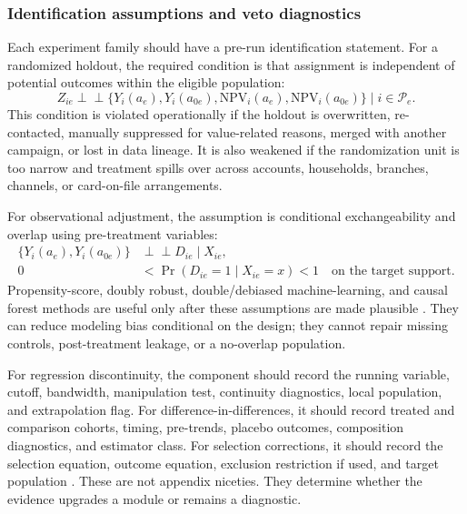 \documentclass[11pt]{article}
\newcommand{\NPV}{\mathrm{NPV}}
\newcommand{\1}{\mathbf{1}}
\begin{document}
\subsubsection{Identification assumptions and veto diagnostics}

Each experiment family should have a pre-run identification statement. For a
randomized holdout, the required condition is that assignment is independent of
potential outcomes within the eligible population:
\begin{equation}
  Z_{ie}
  \perp\!\!\!\perp
  \{Y_i(a_e),Y_i(a_{0e}),\NPV_i(a_e),\NPV_i(a_{0e})\}
  \mid i\in\mathcal{P}_e.
  \label{eq:randomization-assumption}
\end{equation}
This condition is violated operationally if the holdout is overwritten,
re-contacted, manually suppressed for value-related reasons, merged with
another campaign, or lost in data lineage. It is also weakened if the
randomization unit is too narrow and treatment spills over across accounts,
households, branches, channels, or card-on-file arrangements.

For observational adjustment, the assumption is conditional exchangeability
and overlap using pre-treatment variables:
\begin{align}
  \{Y_i(a_e),Y_i(a_{0e})\} &\perp\!\!\!\perp D_{ie}\mid X_{ie}, \\
  0 &< \Pr(D_{ie}=1\mid X_{ie}=x) < 1
      \quad \text{on the target support}.
      \label{eq:overlap-assumption}
\end{align}
Propensity-score, doubly robust, double/debiased machine-learning, and causal
forest methods are useful only after these assumptions are made plausible
\citep{rosenbaum1983propensity,imbenswooldridge2009recent,
chernozhukov2018dml,wager2018causalforests}. They can reduce modeling bias
conditional on the design; they cannot repair missing controls, post-treatment
leakage, or a no-overlap population.

For regression discontinuity, the component should record the running
variable, cutoff, bandwidth, manipulation test, continuity diagnostics, local
population, and extrapolation flag. For difference-in-differences, it should
record treated and comparison cohorts, timing, pre-trends, placebo outcomes,
composition diagnostics, and estimator class. For selection corrections, it
should record the selection equation, outcome equation, exclusion restriction
if used, and target population \citep{heckman1979selection}. These are not
appendix niceties. They determine whether the evidence upgrades a module or
remains a diagnostic.
\end{document}
